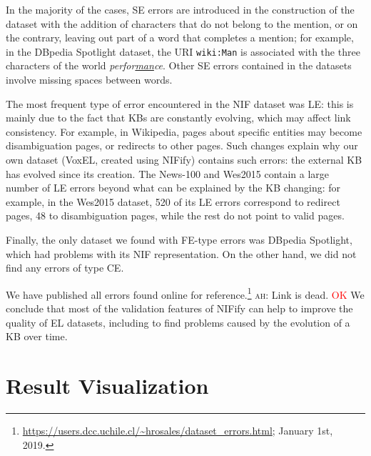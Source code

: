 \documentclass[sigconf]{acmart}
\newcommand{\ah}[1]{{\color{blue}\textsc{ah:} #1}}
\begin{document}
In the majority of the cases, SE errors are introduced in the construction of the dataset with the addition of characters that do not belong to the mention, or on the contrary, leaving out part of a word that completes a mention; for example, in the DBpedia Spotlight dataset, the URI \texttt{wiki:Man} is associated with the three characters of the world \textit{perfor\underline{man}ce}. Other SE errors contained in the datasets involve missing spaces between words. %

The most frequent type of error encountered in the NIF dataset was LE: this is mainly due to the fact that KBs are constantly evolving, which may affect link consistency. For example, in Wikipedia, pages about specific entities may become disambiguation pages, or redirects to other pages. Such changes explain why our own dataset (VoxEL, created using NIFify) contains such errors: the external KB has evolved since its creation. The News-100 and Wes2015 contain a large number of LE errors beyond what can be explained by the KB changing: for example, in the Wes2015 dataset, 520 of its LE errors correspond to redirect pages, 48 to disambiguation pages, while the rest do not point to valid pages.

Finally, the only dataset we found with FE-type errors was DBpedia Spotlight, which had problems with its NIF representation. On the other hand, we did not find any errors of type CE.

We have published all errors found online for reference.\footnote{\url{https://users.dcc.uchile.cl/~hrosales/dataset_errors.html}; January 1st, 2019.} \ah{Link is dead.} \textcolor{red}{OK} We conclude that most of the validation features of NIFify can help to improve the quality of EL datasets, including to find problems caused by the evolution of a KB over time. 

\section{Result Visualization}

\end{document}
